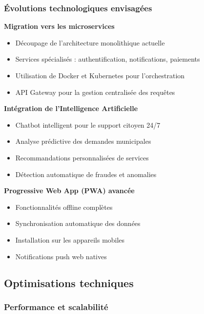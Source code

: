 \subsubsection{Évolutions technologiques envisagées}

\textbf{Migration vers les microservices}
\begin{itemize}
\item Découpage de l'architecture monolithique actuelle
\item Services spécialisés : authentification, notifications, paiements
\item Utilisation de Docker et Kubernetes pour l'orchestration
\item API Gateway pour la gestion centralisée des requêtes
\end{itemize}

\textbf{Intégration de l'Intelligence Artificielle}
\begin{itemize}
\item Chatbot intelligent pour le support citoyen 24/7
\item Analyse prédictive des demandes municipales
\item Recommandations personnalisées de services
\item Détection automatique de fraudes et anomalies
\end{itemize}

\textbf{Progressive Web App (PWA) avancée}
\begin{itemize}
\item Fonctionnalités offline complètes
\item Synchronisation automatique des données
\item Installation sur les appareils mobiles
\item Notifications push web natives
\end{itemize}

\subsection{Optimisations techniques}

\subsubsection{Performance et scalabilité}

